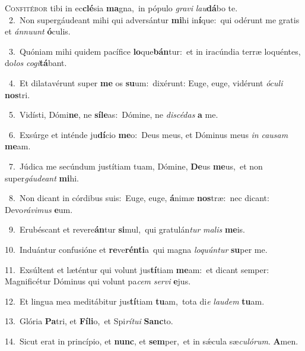 \lettrine{\initial\textcolor{\initialcolor}{C}}{onfitébor} tibi in ec\-\textbf{clé}\-sia \textbf{ma}\-gna,~\star in pópulo \textit{gra}\-\textit{vi} \textit{lau}\-\textbf{dá}bo te.\\
{\numbfont\textcolor{\numbcolor}{~2.}}~Non supergáudeant mihi qui adversántur \textbf{mi}\-hi in\-\textbf{í}\-que:~\star qui odérunt me gratis et \textit{án}\-\textit{nu}\textit{unt} \textbf{ó}\-culis.\par
{\numbfont\textcolor{\numbcolor}{~3.}}~Quóniam mihi quidem pacífice \textbf{lo}\-que\-\textbf{bán}\-tur:~\star et in iracúndia terræ loquéntes, do\textit{los} \textit{co}\-\textit{gi}\textbf{tá}bant.\par
{\numbfont\textcolor{\numbcolor}{~4.}}~Et dilatavérunt super \textbf{me} os \textbf{su}\-um:~\star dixérunt: Euge, euge, vidérunt \textit{ó}\-\textit{cu}\textit{li} \textbf{nos}\-tri.\par
{\numbfont\textcolor{\numbcolor}{~5.}}~Vidísti, Dómi\-\textbf{ne}\-, ne \textbf{sí}\-\textbf{le}as:~\star Dómine, ne \textit{di}\-\textit{scé}\textit{das} \textbf{a} me.\par
{\numbfont\textcolor{\numbcolor}{~6.}}~Exsúrge et inténde ju\-\textbf{dí}\-cio \textbf{me}\-o:~\star Deus meus, et Dóminus meus \textit{in} \textit{cau}\-\textit{sam} \textbf{me}\-am.\par
{\numbfont\textcolor{\numbcolor}{~7.}}~Júdica me secúndum justítiam tuam, Dómine, \textbf{De}\-us \textbf{me}\-us,~\star et non super\-\textit{gáu}\-\textit{de}\textit{ant} \textbf{mi}\-hi.\par
{\numbfont\textcolor{\numbcolor}{~8.}}~Non dicant in córdibus suis:~\dagger Euge, euge, \textbf{á}\-nimæ \textbf{nos}\-træ:~\star nec dicant: Devo\-\textit{rá}\-\textit{vi}\textit{mus} \textbf{e}\-um.\par
{\numbfont\textcolor{\numbcolor}{~9.}}~Erubéscant et revere\-\textbf{án}\-tur \textbf{si}\-mul,~\star qui gratulán\textit{tur} \textit{ma}\-\textit{lis} \textbf{me}\-is.\par
{\numbfont\textcolor{\numbcolor}{10.}}~Induántur confusióne et \textbf{re}\-ve\-\textbf{rén}\-\textbf{ti}a~\star qui magna \textit{lo}\-\textit{quún}\textit{tur} \textbf{su}\-per me.\par
{\numbfont\textcolor{\numbcolor}{11.}}~Exsúltent et læténtur qui volunt jus\-\textbf{tí}\-tiam \textbf{me}\-am:~\star et dicant semper: Magnificétur Dóminus qui volunt pa\textit{cem} \textit{ser}\-\textit{vi} \textbf{e}\-jus.\par
{\numbfont\textcolor{\numbcolor}{12.}}~Et lingua mea meditábitur jus\-\textbf{tí}\-tiam \textbf{tu}\-am,~\star tota di\textit{e} \textit{lau}\-\textit{dem} \textbf{tu}\-am.\par
{\numbfont\textcolor{\numbcolor}{13.}}~Glória \textbf{Pa}\-tri, et \textbf{Fí}\-\textbf{li}o,~\star et Spi\-\textit{rí}\-\textit{tu}\textit{i} \textbf{Sanc}\-to.\par
{\numbfont\textcolor{\numbcolor}{14.}}~Sicut erat in princípio, et \textbf{nunc}\-, et \textbf{sem}\-per,~\star et in sǽcula sæ\-\textit{cu}\-\textit{ló}\textit{rum}. \textbf{A}\-men.\par
